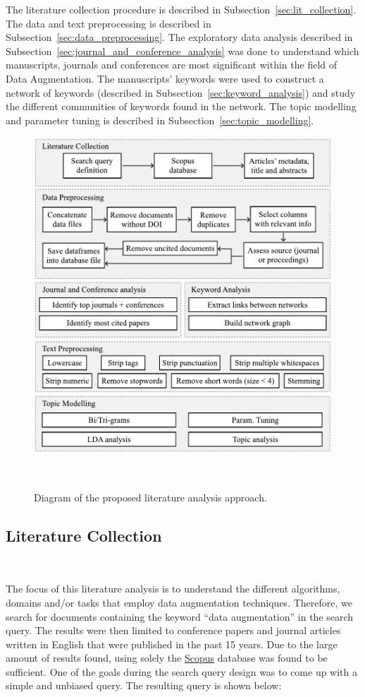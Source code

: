 \documentclass[parskip=full]{scrartcl}
\begin{document}
The literature collection procedure is described in
Subsection~\ref{sec:lit_collection}. The data and text preprocessing is
described in Subsection~\ref{sec:data_preprocessing}. The exploratory data
analysis described in Subsection~\ref{sec:journal_and_conference_analysis} was
done to understand which manuscripts, journals and conferences are most
significant within the field of Data Augmentation. The manuscripts' keywords
were used to construct a network of keywords (described in
Subsection~\ref{sec:keyword_analysis}) and study the different communities of
keywords found in the network. The topic modelling and parameter tuning is
described in Subsection~\ref{sec:topic_modelling}. 

\begin{figure}[H]
	\centering
	\includegraphics[width=.75\linewidth]{../analysis/slr_diagram}
    \caption{Diagram of the proposed literature analysis approach.
    }~\label{fig:slr_diagram}
\end{figure}

\subsection{Literature Collection}~\label{sec:lit_collection}

The focus of this literature analysis is to understand the different
algorithms, domains and/or tasks that employ data augmentation techniques.
Therefore, we search for documents containing the keyword ``data
augmentation'' in the search query. The results were then limited to
conference papers and journal articles written in English that were published
in the past 15 years.  Due to the large amount of results found, using solely
the \href{https://www.scopus.com/}{Scopus} database was found to be
sufficient. One of the goals during the search query design was to come up
with a simple and unbiased query. The resulting query is shown below:
\end{document}
